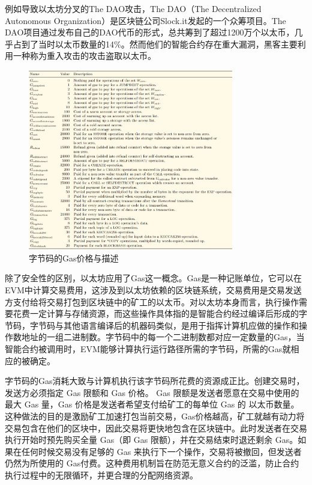例如导致以太坊分叉的The DAO攻击，The DAO（The Decentralized Autonomous Organization）是区块链公司Slock.it发起的一个众筹项目。The DAO项目通过发布自己的DAO代币的形式，总共筹到了超过1200万个以太币，几乎占到了当时以太币数量的14\%。然而他们的智能合约存在重大漏洞，黑客主要利用一种称为重入攻击的攻击盗取以太币。

\begin{figure}[htbp]
\centering
\includegraphics[width=0.8\textwidth]{figures/gasPrice.png}
\caption{字节码的Gas价格与描述}
\label{gasPrice}
\end{figure}

除了安全性的区别，以太坊应用了Gas这一概念。Gas是一种记账单位，它可以在EVM中计算交易费用，这涉及到以太坊依赖的区块链系统，交易费用是交易发送方支付给将交易打包到区块链中的矿工的以太币。对以太坊本身而言，执行操作需要花费一定计算与存储资源，而这些操作具体指的是智能合约经过编译后形成的字节码，字节码与其他语言编译后的机器码类似，是用于指挥计算机应做的操作和操作数地址的一组二进制数。字节码中的每一个二进制数都对应一定数量的Gas，当智能合约被调用时，EVM能够计算执行运行路径所需的字节码，所需的Gas就相应的被确定。

字节码的Gas消耗大致与计算机执行该字节码所花费的资源成正比。创建交易时，发送方必须指定 Gas 限额和 Gas 价格。 Gas 限额是发送者愿意在交易中使用的最大 Gas 量，Gas 价格是发送者希望支付给矿工的每单位 Gas 的 以太币数量。
这种做法的目的是激励矿工加速打包当前交易，Gas价格越高，矿工就越有动力将交易包含在他们的区块中，因此交易将更快地包含在区块链中。此时发送者在交易执行开始时预先购买全量 Gas（即 Gas 限额），并在交易结束时退还剩余 Gas。如果在任何时候交易没有足够的 Gas 来执行下一个操作，交易将被撤回，但发送者仍然为所使用的 Gas付费。这种费用机制旨在防范无意义合约的泛滥，防止合约执行过程中的无限循环，并更合理的分配网络资源。

